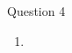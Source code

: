 \documentclass{article}
\begin{document}
\vspace{1cm}
 Question 4 \\

  \begin{enumerate}

  \item 

    \vspace{0.5cm}

  \end{enumerate}
\end{document}
